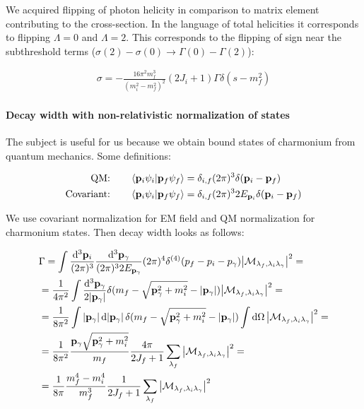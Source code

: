 We acquired flipping of photon helicity in comparison to matrix element contributing to the cross-section. In the language of total helicities it corresponds to flipping $\Lambda=0$ and $\Lambda=2$. This corresponds to the flipping of sign near the subthreshold terms ($\sigma(2) - \sigma(0) \rightarrow \Gamma(0) - \Gamma(2)$):

\begin{align} \label{eq:app:crsc-dw-subthr}
    \sigma = -\frac{16 \pi^2 m_f^3}{(m_i^2 - m_f^2)^2} (2J_i + 1) \Gamma \delta(s - m_f^2)
\end{align}

\paragraph{Decay width with non-relativistic normalization of states} \label{par:app:dw-nr}
The subject is useful for us because we obtain bound states of charmonium from quantum mechanics. Some definitions:

\begin{align}
    \text{QM:}\qquad &\braket{\mathbf{p}_i \psi_i}{\mathbf{p}_f \psi_f} = \delta_{i, f} (2\pi)^3 \delta(\mathbf{p}_i - \mathbf{p}_f) \\
    \text{Covariant:}\qquad &\braket{\mathbf{p}_i \psi_i}{\mathbf{p}_f \psi_f} = \delta_{i, f} (2\pi)^3 2 E_{\mathbf{p}_{i}} \delta(\mathbf{p}_i - \mathbf{p}_f)
\end{align}

We use covariant normalization for EM field and QM normalization for charmonium states. Then decay width looks as follows:

\begin{align}
    &\Gamma = \int \frac{\dd[3]{\mathbf{p}_i}}{(2\pi)^3} \frac{\dd[3]{\mathbf{p_\gamma}}}{(2 \pi)^3 2 E_{\mathbf{p_\gamma}}}  (2\pi)^4 \delta^{(4)}(p_f - p_i - p_\gamma) \abs{\mathcal{M}_{\lambda_f, \lambda_i \lambda_\gamma}}^2 = \\
    &= \frac{1}{4 \pi^2} \int \frac{\dd[3]{\mathbf{p}_\gamma}}{2 \abs{\mathbf{p}_\gamma}} \delta(m_f - \sqrt{\mathbf{p}_\gamma^2 + m_i^2} - \abs{\mathbf{p}_\gamma}) \abs{\mathcal{M}_{\lambda_f, \lambda_i \lambda_\gamma}}^2 = \\
    &= \frac{1}{8\pi^2} \int \abs{\mathbf{p}_\gamma} \dd{\abs{\mathbf{p}_\gamma}} \delta(m_f - \sqrt{\mathbf{p}_\gamma^2 + m_i^2} - \abs{\mathbf{p}_\gamma}) \int \dd{\Omega}\abs{\mathcal{M}_{\lambda_f, \lambda_i \lambda_\gamma}}^2 = \\
    &= \frac{1}{8 \pi^2} \frac{\mathbf{p}_\gamma \sqrt{\mathbf{p}_\gamma^2 + m_i^2}}{m_f} \frac{4 \pi}{2J_f + 1} \sum_{\lambda_f} \abs{\mathcal{M}_{\lambda_f, \lambda_i \lambda_\gamma}}^2 = \\
    &= \frac{1}{8 \pi} \frac{m_f^4 - m_i^4}{m_f^3} \frac{1}{2J_f + 1} \sum_{\lambda_f} \abs{\mathcal{M}_{\lambda_f, \lambda_i \lambda_\gamma}}^2
\end{align}
